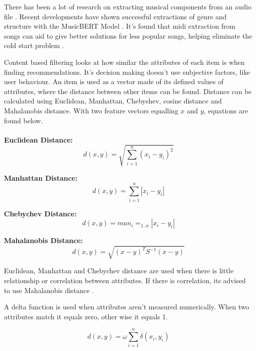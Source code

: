 There has been a lot of research on extracting musical components from an audio file \citep{ribecky_multi-input_2021} \citep{zhao_musical_2022}. Recent developments have shown successful extractions of genre and structure with the MusicBERT Model \citep{zhu_musicbert_2021}. It's found that midi extraction from songs can aid to give better solutions for less popular songs, helping eliminate the cold start problem \citep{yadav_improved_2022}.

Content based filtering looks at how similar the attributes of each item is when finding recommendations. It's decision making doesn't use subjective factors, like user behaviour. An item is used as a vector made of its defined values of attributes, where the distance between other items can be found. Distance can be calculated using Euclidean, Manhattan, Chebyshev, cosine distance and Mahalanobis distance. With two feature vectors equalling $x$ and $y$, equations are found below.
\\
\\
\textbf{Euclidean Distance:}
\begin{equation}
	d(x,y) = \sqrt{\sum _{i=1} ^{n}(x_{i} - y_{i})^{2}}
\end{equation}

\textbf{Manhattan Distance:}
\begin{equation}
	d(x,y) = \sum _{i=1} ^{n} | x_{i} - y_{i} |
\end{equation}

\textbf{Chebychev Distance:}
\begin{equation}
	d(x,y) = man_{i} = _{1 . . n} | x_{i} - y_{i} |
\end{equation}

\textbf{Mahalanobis Distance:}
\begin{equation}
	d(x,y) = \sqrt{ ( x - y )^{ T } S^{ -1 } ( x - y ) }
\end{equation}

Euclidean, Manhattan and Chebychev distance are used when there is little relationship or correlation between attributes. If there is correlation, its advised to use Mahalanobis distance \citep{celma_recommendation_2010}.

A delta function is used when attributes aren't measured numerically. When two attributes match it equals zero, other wise it equals 1.

\begin{equation}
	d(x,y) = \omega \sum _{ i = 1 } ^{ n } \delta (x _{i}, y _{i})
\end{equation}

